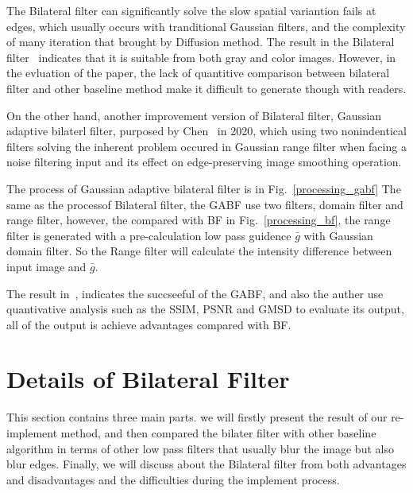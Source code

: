 \documentclass[12pt]{article}
\begin{document}

The Bilateral filter can significantly solve the slow spatial variantion fails at edges, which usually occurs with tranditional Gaussian filters, and the complexity of many iteration that brought by Diffusion method. 
The result in the Bilateral filter~\cite{paper_bf} indicates that it is suitable from both gray and color images. 
However, in the evluation of the paper, the lack of quantitive comparison between bilateral filter and other baseline method make it difficult to generate though with readers.

On the other hand, another improvement version of Bilateral filter, Gaussian adaptive bilaterl filter, purposed by Chen~\cite{9200678} in 2020, which using two nonindentical filters solving the inherent problem occured in Gaussian range filter when facing a noise filtering input and its effect on edge-preserving image smoothing operation. 

The process of Gaussian adaptive bilateral filter is in Fig.~\ref{processing_gabf}
The same as the processof Bilateral filter, the GABF use two filters, domain filter and range filter, however, the compared with BF in Fig.~\ref{processing_bf}, the range filter is generated with a pre-calculation low pass guidence $\bar{g}$ with Gaussian domain filter. 
So the Range filter will calculate the intensity difference between input image and $\bar{g}$.

The result in~\cite{9200678}, indicates the succseeful of the GABF, and also the auther use quantivative analysis such as the SSIM, PSNR and GMSD to evaluate its output, all of the output is achieve advantages compared with BF.





\clearpage
\section{Details of Bilateral Filter}
\label{section Bilateral_filter}
This section contains three main parts. we will firstly present the result of our re-implement method, and then compared the bilater filter with other baseline algorithm in terms of other low pass filters that usually blur the image but also blur edges. 
Finally, we will discuss about the Bilateral filter from both advantages and disadvantages and the difficulties during the implement process.
\end{document}
